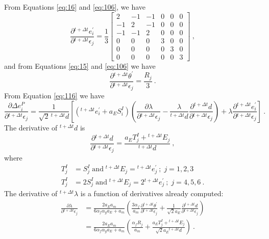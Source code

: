 From Equations \ref{eq:16} and \ref{eq:106}, we have
\begin{equation}
\frac{\partial\phantom{}^{t+\Delta t}e_{i}^{\prime}}{\partial\phantom{}^{t+\Delta t}\epsilon_{j}}=\frac{1}{3}\left[\begin{array}{cccccc}
2 & -1 & -1 & 0 & 0 & 0\\
-1 & 2 & -1 & 0 & 0 & 0\\
-1 & -1 & 2 & 0 & 0 & 0\\
0 & 0 & 0 & 3 & 0 & 0\\
0 & 0 & 0 & 0 & 3 & 0\\
0 & 0 & 0 & 0 & 0 & 3
\end{array}\right]\:,\label{eq:120}
\end{equation}
and from Equations \ref{eq:15} and \ref{eq:106} we have
\begin{equation}
\frac{\partial\phantom{}^{t+\Delta t}\theta^{\prime}}{\partial\phantom{}^{t+\Delta t}\epsilon_{j}}=\frac{R_{j}}{3}\:.\label{eq:121}
\end{equation}
From Equation \ref{eq:116} we have
\begin{equation}
\frac{\partial\Delta e_{i}^{P}}{\partial\phantom{}^{t+\Delta t}\epsilon_{j}}=\frac{1}{\sqrt{2}\,\phantom{}^{t+\Delta t}d}\left[\left(^{t+\Delta t}e_{i}^{\prime}+a_{E}S_{i}^{I}\right)\left(\frac{\partial\lambda}{\partial\phantom{}^{t+\Delta t}\epsilon_{j}}-\frac{\lambda}{\phantom{}^{t+\Delta t}d}\frac{\partial\phantom{}^{t+\Delta t}d}{\partial\phantom{}^{t+\Delta t}\epsilon_{j}}\right)+\lambda\frac{\partial\phantom{}^{t+\Delta t}e_{i}^{\prime}}{\partial\phantom{}^{t+\Delta t}\epsilon_{j}}\right]\:.\label{eq:122}
\end{equation}
The derivative of $^{t+\Delta t}d$ is
\begin{equation}
\frac{\partial\phantom{}^{t+\Delta t}d}{\partial\phantom{}^{t+\Delta t}\epsilon_{j}}=\frac{a_{E}T_{j}^{I}+\phantom{}^{t+\Delta t}E_{j}}{\phantom{}^{t+\Delta t}d}\:,\label{eq:123}
\end{equation}
where
\begin{align}
T_{j}^{I} & =S_{j}^{I}\;\mathrm{and}\;\phantom{}^{t+\Delta t}E_{j}=\phantom{}^{t+\Delta t}e_{j}^{\prime}\:;\; j=1,2,3\nonumber \\
T_{j}^{I} & =2S_{j}^{I}\;\mathrm{and}\;\phantom{}^{t+\Delta t}E_{j}=2\phantom{}^{t+\Delta t}e_{j}^{\prime}\:;\; j=4,5,6\:.\label{eq:124}
\end{align}
The derivative of $^{t+\Delta t}\lambda$ is a function of derivatives
already computed:
\begin{align}
\frac{\partial\lambda}{\partial\phantom{}^{t+\Delta t}\epsilon_{j}} & =\frac{2a_{E}a_{m}}{6\alpha_{f}\alpha_{g}a_{E}+a_{m}}\left(\frac{3\alpha_{f}}{a_{m}}\frac{\partial\phantom{}^{t+\Delta t}\theta^{\prime}}{\partial\phantom{}^{t+\Delta t}\epsilon_{j}}+\frac{1}{\sqrt{2}a_{E}}\frac{\partial\phantom{}^{t+\Delta t}d}{\partial\phantom{}^{t+\Delta t}\epsilon_{j}}\right)\nonumber \\
 & =\frac{2a_{E}a_{m}}{6\alpha_{f}\alpha_{g}a_{E}+a_{m}}\left(\frac{\alpha_{f}R_{j}}{a_{m}}+\frac{a_{E}T_{j}^{I}+\phantom{}^{t+\Delta t}E_{j}}{\sqrt{2}a_{E}\phantom{}^{t+\Delta t}d}\right)\:.\label{eq:125}
\end{align}

